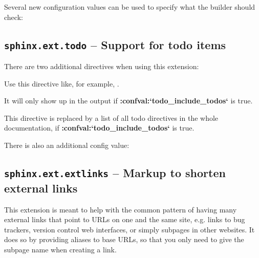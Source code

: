 \documentclass[letterpaper,10pt,english]{sphinxmanual}
\begin{document}
Several new configuration values can be used to specify what the builder
should check:


\subsection{\texttt{sphinx.ext.todo} -- Support for todo items}
\label{ext/todo::doc}\label{ext/todo:sphinx-ext-todo-support-for-todo-items}\label{ext/todo:module-sphinx.ext.todo}

There are two additional directives when using this extension:

\begin{fulllineitems}
\label{ext/todo:directive-todo}
Use this directive like, for example, {\hyperref[markup/para:directive\string-note]{}}.

It will only show up in the output if {\color{red}\bfseries{}:confval:{}`todo\_include\_todos{}`} is true.

\end{fulllineitems}


\begin{fulllineitems}
\label{ext/todo:directive-todolist}
This directive is replaced by a list of all todo directives in the whole
documentation, if {\color{red}\bfseries{}:confval:{}`todo\_include\_todos{}`} is true.

\end{fulllineitems}


There is also an additional config value:


\subsection{\texttt{sphinx.ext.extlinks} -- Markup to shorten external links}
\label{ext/extlinks::doc}\label{ext/extlinks:sphinx-ext-extlinks-markup-to-shorten-external-links}\label{ext/extlinks:module-sphinx.ext.extlinks}

This extension is meant to help with the common pattern of having many external
links that point to URLs on one and the same site, e.g. links to bug trackers,
version control web interfaces, or simply subpages in other websites.  It does
so by providing aliases to base URLs, so that you only need to give the subpage
name when creating a link.
\end{document}
